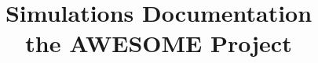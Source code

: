 \documentclass[a4paper,11pt,fleqn,oneside]{book}
\begin{document}
\title{\textbf{Simulations Documentation} \\
the AWESOME Project}
\maketitle
\tableofcontents





\end{document}
